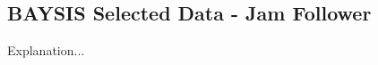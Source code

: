 \documentclass[a4paper,headsepline,footsepline,fontsize=11pt,BCOR=12mm,DIV=12]{report}
\newcommand{\nocontentsline}[3]{}
\newcommand{\tocless}[2]{\bgroup\let\addcontentsline=\nocontentsline#1{#2}\egroup}
\begin{document}
\begin{appendices}
% 	

% 	

% 	

% 	

\tocless\section{BAYSIS Selected Data - Jam Follower}
\label{appendix_baysis_selected_endJam}

Explanation...


\end{appendices}
\end{document}
